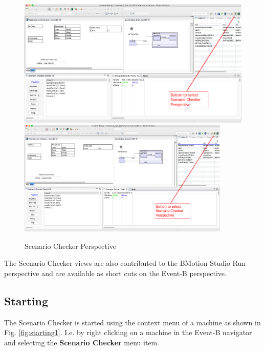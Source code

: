 \begin{figure}[!htbp]
	\centering
	\ifplastex
	\includegraphics[width=900]{figures/perspective}
	\else
	\includegraphics[width=0.9\textwidth]{figures/perspective}
	\fi
	\caption{Scenario Checker Perspective}
	\label{fig:perspective}
\end{figure}

The Scenario Checker views are also contributed to the BMotion Studio Run perspective and are available as short cuts on the Event-B perspective.

\subsection{Starting}
\label{sec:starting}

The Scenario Checker is started using the context menu of a machine as shown in Fig. \ref{fig:starting1}.
I.e. by right clicking on a machine in the Event-B navigator and selecting the \textbf{Scenario Checker} menu item.

